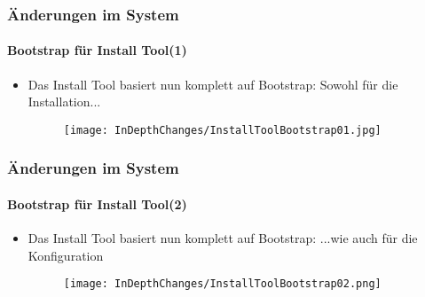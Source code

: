 %

\begin{frame}[fragile]
	\frametitle{Änderungen im System}
	\framesubtitle{Bootstrap für Install Tool(1)}

	\begin{itemize}

		\item Das Install Tool basiert nun komplett auf Bootstrap: Sowohl für die Installation...

			\begin{figure}
				\texttt{[image: InDepthChanges/InstallToolBootstrap01.jpg]}
			\end{figure}

	\end{itemize}

\end{frame}


\begin{frame}[fragile]
	\frametitle{Änderungen im System}
	\framesubtitle{Bootstrap für Install Tool(2)}

	\begin{itemize}

		\item Das Install Tool basiert nun komplett auf Bootstrap: ...wie auch für die Konfiguration

			\begin{figure}
				\texttt{[image: InDepthChanges/InstallToolBootstrap02.png]}
			\end{figure}

	\end{itemize}

\end{frame}

